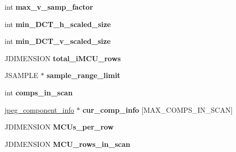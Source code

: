 \begin{DoxyCompactItemize}
\item 
\mbox{\label{structjpeg__decompress__struct_ac502831dd72cbe2663eb06f98cf0a489}} 
int {\bfseries max\+\_\+v\+\_\+samp\+\_\+factor}
\item 
\mbox{\label{structjpeg__decompress__struct_a8a89345d171d3f17315c9778cb634e6e}} 
int {\bfseries min\+\_\+\+D\+C\+T\+\_\+h\+\_\+scaled\+\_\+size}
\item 
\mbox{\label{structjpeg__decompress__struct_a91ac3f0ca9c554b1690a0d18bc351762}} 
int {\bfseries min\+\_\+\+D\+C\+T\+\_\+v\+\_\+scaled\+\_\+size}
\item 
\mbox{\label{structjpeg__decompress__struct_ab210038772e2c74c35b6c0a36db9c6a9}} 
J\+D\+I\+M\+E\+N\+S\+I\+ON {\bfseries total\+\_\+i\+M\+C\+U\+\_\+rows}
\item 
\mbox{\label{structjpeg__decompress__struct_ac5b2ee6d74cd320a9634b7e37b04c8dc}} 
J\+S\+A\+M\+P\+LE $\ast$ {\bfseries sample\+\_\+range\+\_\+limit}
\item 
\mbox{\label{structjpeg__decompress__struct_a2a28db865b9d49bfa9bc6335abf331c3}} 
int {\bfseries comps\+\_\+in\+\_\+scan}
\item 
\mbox{\label{structjpeg__decompress__struct_add1d9f7f0d5ecc6931ceff438e50ec0c}} 
\hyperlink{structjpeg__component__info}{jpeg\+\_\+component\+\_\+info} $\ast$ {\bfseries cur\+\_\+comp\+\_\+info} \mbox{[}M\+A\+X\+\_\+\+C\+O\+M\+P\+S\+\_\+\+I\+N\+\_\+\+S\+C\+AN\mbox{]}
\item 
\mbox{\label{structjpeg__decompress__struct_aafebfaa0046cc8b449ce2401c174697f}} 
J\+D\+I\+M\+E\+N\+S\+I\+ON {\bfseries M\+C\+Us\+\_\+per\+\_\+row}
\item 
\mbox{\label{structjpeg__decompress__struct_a6d1110064a4f2fbc46a8831fd148bca6}} 
J\+D\+I\+M\+E\+N\+S\+I\+ON {\bfseries M\+C\+U\+\_\+rows\+\_\+in\+\_\+scan}
\item 
\mbox{\label{structjpeg__decompress__struct_a76d2872b589796cb8d66428e660e37fb}} 

\end{DoxyCompactItemize}
